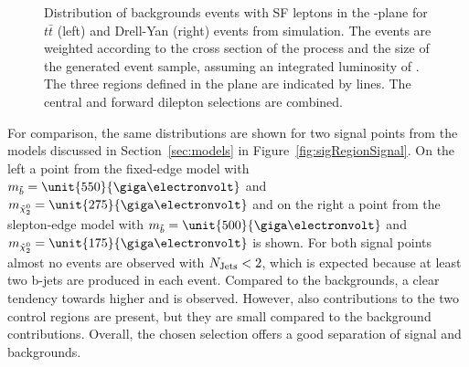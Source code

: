 \begin{figure}[htbp]
\begin{minipage}[t]{0.49\textwidth}
\end{minipage}
\caption{Distribution of backgrounds events with SF leptons in the \MET-\njets plane for $t\bar{t}$ (left) and Drell-Yan (right) events from simulation. The events are weighted according to the cross section of the process and the size of the generated event sample, assuming an integrated luminosity of \lumi. The three regions defined in the plane are indicated by lines. The central and forward dilepton selections are combined.}
\label{fig:sigRegionBG}
\end{figure}  
  
For comparison, the same distributions are shown for two signal points from the models discussed in Section~\ref{sec:models} in Figure~\ref{fig:sigRegionSignal}. On the left a point from the fixed-edge model with $m_{\sbottom} = \unit{550}{\giga\electronvolt}$ and $m_{\secondchi} = \unit{275}{\giga\electronvolt}$ and on the right a point from the slepton-edge model with $m_{\sbottom} = \unit{500}{\giga\electronvolt}$ and $m_{\secondchi} = \unit{175}{\giga\electronvolt}$ is shown. For both signal points almost no events are observed with $N_\text{Jets} < 2$, which is expected because at least two b-jets are produced in each event. Compared to the backgrounds, a clear tendency towards higher \MET and \njets is observed. However, also contributions to the two control regions are present, but they are small compared to the background contributions. Overall, the chosen selection offers a good separation of signal and backgrounds.
